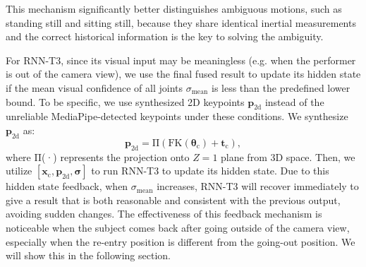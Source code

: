 %
This mechanism significantly better distinguishes ambiguous motions, such as standing still and sitting still, because they share identical inertial measurements and the correct historical information is the key to solving the ambiguity.
%
\par
For RNN-T3, since its visual input may be meaningless (e.g. when the performer is out of the camera view), we use the final fused result to update its hidden state if the mean visual confidence of all joints $\sigma_\mathrm{mean}$ is less than the predefined lower bound.
%
To be specific, we use synthesized 2D keypoints $\boldsymbol{p}_\mathrm{2d}$ instead of the unreliable MediaPipe-detected keypoints under these conditions.
%
We synthesize $\boldsymbol{p}_\mathrm{2d}$ as:
\begin{equation}
    \boldsymbol{p}_\mathrm{2d} = \mathrm{\Pi}\left(\mathrm{FK}\left(\boldsymbol{\theta}_\mathrm{c}\right)+\boldsymbol{t}_\mathrm{c}\right),
\end{equation}
where $\mathrm{\Pi}$(·) represents the projection onto $Z=1$ plane from 3D space.
%
Then, we utilize $[\boldsymbol{x}_{\mathrm{c}},\boldsymbol{p}_{\mathrm{2d}},\boldsymbol{\sigma}]$ to run RNN-T3 to update its hidden state.
%
Due to this hidden state feedback, when $\sigma_\mathrm{mean}$ increases, RNN-T3 will recover immediately to give a result that is both reasonable and consistent with the previous output, avoiding sudden changes.
%
The effectiveness of this feedback mechanism is noticeable when the subject comes back after going outside of the camera view, especially when the re-entry position is different from the going-out position. We will show this in the following section.
%